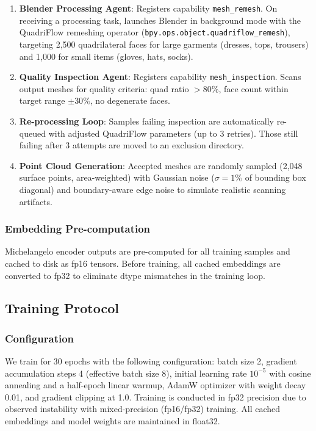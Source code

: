 \documentclass[conference]{IEEEtran}
\begin{document}
\begin{enumerate}
\item \textbf{Blender Processing Agent}: Registers capability \texttt{mesh\_remesh}. On receiving a processing task, launches Blender in background mode with the QuadriFlow remeshing operator (\texttt{bpy.ops.object.quadriflow\_remesh}), targeting 2,500 quadrilateral faces for large garments (dresses, tops, trousers) and 1,000 for small items (gloves, hats, socks).
\item \textbf{Quality Inspection Agent}: Registers capability \texttt{mesh\_inspection}. Scans output meshes for quality criteria: quad ratio $> 80\%$, face count within target range $\pm 30\%$, no degenerate faces.
\item \textbf{Re-processing Loop}: Samples failing inspection are automatically re-queued with adjusted QuadriFlow parameters (up to 3 retries). Those still failing after 3 attempts are moved to an exclusion directory.
\item \textbf{Point Cloud Generation}: Accepted meshes are randomly sampled (2,048 surface points, area-weighted) with Gaussian noise ($\sigma = 1\%$ of bounding box diagonal) and boundary-aware edge noise to simulate realistic scanning artifacts.
\end{enumerate}

\subsubsection{Embedding Pre-computation}

Michelangelo encoder outputs are pre-computed for all training samples and cached to disk as fp16 tensors.
Before training, all cached embeddings are converted to fp32 to eliminate dtype mismatches in the training loop.

\subsection{Training Protocol}

\subsubsection{Configuration}

We train for 30 epochs with the following configuration: batch size 2, gradient accumulation steps 4 (effective batch size 8), initial learning rate $10^{-5}$ with cosine annealing and a half-epoch linear warmup, AdamW optimizer with weight decay 0.01, and gradient clipping at 1.0.
Training is conducted in fp32 precision due to observed instability with mixed-precision (fp16/fp32) training.
All cached embeddings and model weights are maintained in float32.
\end{document}
